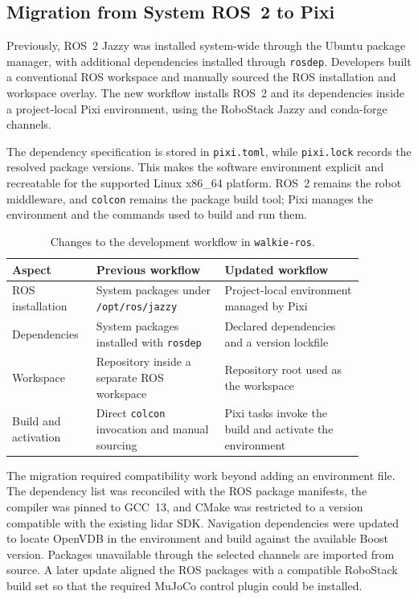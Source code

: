 \documentclass[12pt,a4paper]{article}
\begin{document}
\subsection*{Migration from System ROS~2 to Pixi}

Previously, ROS~2 Jazzy was installed system-wide through the Ubuntu
package manager, with additional dependencies installed through
\texttt{rosdep}. Developers built a conventional ROS workspace and
manually sourced the ROS installation and workspace overlay. The new
workflow installs ROS~2 and its dependencies inside a project-local
Pixi environment, using the RoboStack Jazzy and conda-forge channels.

The dependency specification is stored in \texttt{pixi.toml}, while
\texttt{pixi.lock} records the resolved package versions. This makes the
software environment explicit and recreatable for the supported
Linux x86\_64 platform. ROS~2 remains the robot middleware, and
\texttt{colcon} remains the package build tool; Pixi manages the
environment and the commands used to build and run them.

\begin{table}[htbp]
    \centering
    \small
    \renewcommand{\arraystretch}{1.15}
    \begin{tabular}{p{0.18\linewidth} p{0.33\linewidth} p{0.36\linewidth}}
        \hline
        Aspect & Previous workflow & Updated workflow \\
        \hline
        ROS installation & System packages under \texttt{/opt/ros/jazzy}
            & Project-local environment managed by Pixi \\
        Dependencies & System packages installed with \texttt{rosdep}
            & Declared dependencies and a version lockfile \\
        Workspace & Repository inside a separate ROS workspace
            & Repository root used as the workspace \\
        Build and activation & Direct \texttt{colcon} invocation and manual sourcing
            & Pixi tasks invoke the build and activate the environment \\
        \hline
    \end{tabular}
    \caption{\small{Changes to the development workflow in \texttt{walkie-ros}.}}
    \label{tab:migration_pixi_workflow}
\end{table}

\newpage
The migration required compatibility work beyond adding an environment
file. The dependency list was reconciled with the ROS package manifests,
the compiler was pinned to GCC~13, and CMake was restricted to a version
compatible with the existing lidar SDK. Navigation dependencies were
updated to locate OpenVDB in the environment and build against the
available Boost version. Packages unavailable through the selected
channels are imported from source. A later update aligned the ROS
packages with a compatible RoboStack build set so that the required
MuJoCo control plugin could be installed.
\end{document}
